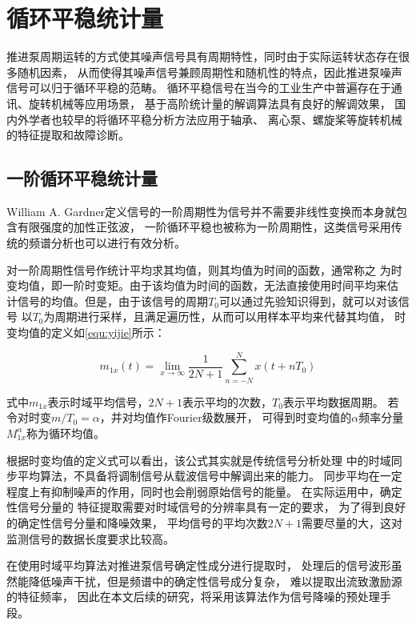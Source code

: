 \section{循环平稳统计量}
推进泵周期运转的方式使其噪声信号具有周期特性，同时由于实际运转状态存在很多随机因素，
从而使得其噪声信号兼顾周期性和随机性的特点，因此推进泵噪声信号可以归于循环平稳的范畴。
循环平稳信号在当今的工业生产中普遍存在于通讯、旋转机械等应用场景，
基于高阶统计量的解调算法具有良好的解调效果，
国内外学者也较早的将循环平稳分析方法应用于轴承、
离心泵、螺旋桨等旋转机械的特征提取和故障诊断。
\subsection{一阶循环平稳统计量}
William A. Gardner定义信号的一阶周期性为信号并不需要非线性变换而本身就包含有限强度的加性正弦波，
一阶循环平稳也被称为一阶周期性，这类信号采用传统的频谱分析也可以进行有效分析。

对一阶周期性信号作统计平均求其均值，则其均值为时间的函数，通常称之
为时变均值，即一阶时变矩。由于该均值为时间的函数，无法直接使用时间平均来估
计信号的均值。但是，由于该信号的周期$T_{0}$可以通过先验知识得到，就可以对该信号
以$T_{0}$为周期进行采样，且满足遍历性，从而可以用样本平均来代替其均值，
时变均值的定义如\autoref{equ:yijie}所示：

\begin{equation}
    \label{equ:yijie}
    m_{1x} \left ( t \right ) =\lim_{x \to \infty} \frac{1}{2N+1}\sum_{n=-N}^{N}x\left ( t+nT_{0}  \right )   
\end{equation}

式中$m_{1x}$表示时域平均信号，$2N+1$表示平均的次数，$T_{0}$表示平均数据周期。
若令对时变$m/T_{0} =\alpha$，并对均值作Fourier级数展开，
可得到时变均值的$\alpha$频率分量$M_{1x}^{\alpha}$称为循环均值。

根据时变均值的定义式可以看出，该公式其实就是传统信号分析处理
中的时域同步平均算法，不具备将调制信号从载波信号中解调出来的能力。
同步平均在一定程度上有抑制噪声的作用，同时也会削弱原始信号的能量。
在实际运用中，确定性信号分量的
特征提取需要对时域信号的分辨率具有一定的要求，
为了得到良好的确定性信号分量和降噪效果，
平均信号的平均次数$2N+1$需要尽量的大，这对监测信号的数据长度要求比较高。

在使用时域平均算法对推进泵信号确定性成分进行提取时，
处理后的信号波形虽然能降低噪声干扰，但是频谱中的确定性信号成分复杂，
难以提取出流致激励源的特征频率，
因此在本文后续的研究，将采用该算法作为信号降噪的预处理手段。


